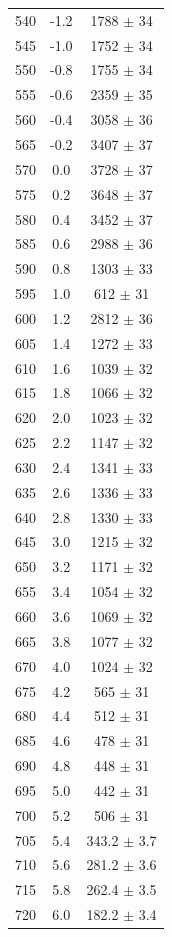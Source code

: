 \documentclass[a4paper,12pt]{article}
\begin{document}
\begin{center}
\begin{longtable}{|c|c|c|}
540 & -1.2 & 1788 $\pm$  34 \\ 
545 & -1.0 & 1752 $\pm$  34 \\ 
550 & -0.8 & 1755 $\pm$  34 \\ 
555 & -0.6 & 2359 $\pm$  35 \\ 
560 & -0.4 & 3058 $\pm$  36 \\ 
565 & -0.2 & 3407 $\pm$  37 \\ 
570 & 0.0 & 3728 $\pm$  37 \\ 
575 & 0.2 & 3648 $\pm$  37 \\ 
580 & 0.4 & 3452 $\pm$  37 \\ 
585 & 0.6 & 2988 $\pm$  36 \\ 
590 & 0.8 & 1303 $\pm$  33 \\ 
595 & 1.0 & 612 $\pm$  31 \\ 
600 & 1.2 & 2812 $\pm$  36 \\ 
605 & 1.4 & 1272 $\pm$  33 \\ 
610 & 1.6 & 1039 $\pm$  32 \\ 
615 & 1.8 & 1066 $\pm$  32 \\ 
620 & 2.0 & 1023 $\pm$  32 \\ 
625 & 2.2 & 1147 $\pm$  32 \\ 
630 & 2.4 & 1341 $\pm$  33 \\ 
635 & 2.6 & 1336 $\pm$  33 \\ 
640 & 2.8 & 1330 $\pm$  33 \\ 
645 & 3.0 & 1215 $\pm$  32 \\ 
650 & 3.2 & 1171 $\pm$  32 \\ 
655 & 3.4 & 1054 $\pm$  32 \\ 
660 & 3.6 & 1069 $\pm$  32 \\ 
665 & 3.8 & 1077 $\pm$  32 \\ 
670 & 4.0 & 1024 $\pm$  32 \\ 
675 & 4.2 & 565 $\pm$  31 \\ 
680 & 4.4 & 512 $\pm$  31 \\ 
685 & 4.6 & 478 $\pm$  31 \\ 
690 & 4.8 & 448 $\pm$  31 \\ 
695 & 5.0 & 442 $\pm$  31 \\ 
700 & 5.2 & 506 $\pm$  31 \\ 
705 & 5.4 & 343.2 $\pm$  3.7 \\ 
710 & 5.6 & 281.2 $\pm$  3.6 \\ 
715 & 5.8 & 262.4 $\pm$  3.5 \\ 
720 & 6.0 & 182.2 $\pm$  3.4 \\ 

\end{longtable}
\end{center}
\end{document}
